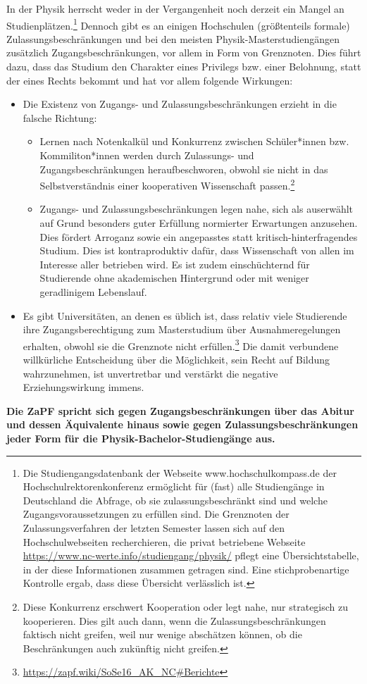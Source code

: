 \documentclass[DIV=calc]{scrartcl}
\begin{document}
In der Physik herrscht weder in der Vergangenheit noch derzeit ein Mangel an Studienplätzen.\footnote{Die Studiengangsdatenbank der Webseite www.hochschulkompass.de der Hochschulrektorenkonferenz ermöglicht für (fast) alle Studiengänge in Deutschland die Abfrage, ob sie zulassungsbeschränkt sind und welche Zugangsvoraussetzungen zu erfüllen sind. Die Grenznoten der Zulassungsverfahren der letzten Semester lassen sich auf den Hochschulwebseiten recherchieren, die privat betriebene Webseite \url{https://www.nc-werte.info/studiengang/physik/} pflegt eine Übersichtstabelle, in der diese Informationen zusammen getragen sind. Eine stichprobenartige Kontrolle ergab, dass diese Übersicht verlässlich ist.} Dennoch gibt es an einigen Hochschulen (größtenteils formale) Zulassungsbeschränkungen und bei den meisten Physik-Masterstudiengängen zusätzlich Zugangsbeschränkungen, vor allem in Form von Grenznoten. Dies führt dazu, dass das Studium den Charakter eines Privilegs bzw. einer Belohnung, statt der eines Rechts bekommt und hat vor allem folgende Wirkungen: 
\begin{itemize}
\item Die Existenz von Zugangs- und Zulassungsbeschränkungen erzieht in die falsche Richtung: 
\begin{itemize}
\item Lernen nach Notenkalkül und Konkurrenz zwischen Schüler*innen bzw. Kommiliton*innen werden durch Zulassungs- und Zugangsbeschränkungen heraufbeschworen, obwohl sie nicht in das Selbstverständnis einer kooperativen Wissenschaft passen.\footnote{Diese Konkurrenz erschwert Kooperation oder legt nahe, nur strategisch zu kooperieren. Dies gilt auch dann, wenn die Zulassungsbeschränkungen faktisch nicht greifen, weil nur wenige abschätzen können, ob die Beschränkungen auch zukünftig nicht greifen.}
\item Zugangs- und Zulassungsbeschränkungen legen nahe, sich als auserwählt auf Grund besonders guter Erfüllung normierter Erwartungen anzusehen. Dies fördert Arroganz sowie ein angepasstes statt kritisch-hinterfragendes Studium. Dies ist kontraproduktiv dafür, dass Wissenschaft von allen im Interesse aller betrieben wird. Es ist zudem einschüchternd für Studierende ohne akademischen Hintergrund oder mit weniger geradlinigem Lebenslauf. 
\end{itemize}
\item Es gibt Universitäten, an denen es üblich ist, dass relativ viele Studierende ihre Zugangsberechtigung zum Masterstudium über Ausnahmeregelungen erhalten, obwohl sie die Grenznote nicht erfüllen.\footnote{\url{https://zapf.wiki/SoSe16_AK_NC#Berichte}} Die damit verbundene willkürliche Entscheidung über die Möglichkeit, sein Recht auf Bildung wahrzunehmen, ist unvertretbar und verstärkt die negative Erziehungswirkung immens. 
\end{itemize}
\textbf{Die ZaPF spricht sich gegen Zugangsbeschränkungen über das Abitur und dessen Äquivalente hinaus sowie gegen Zulassungsbeschränkungen jeder Form für die Physik-Bachelor-Studiengänge aus.}
\end{document}
